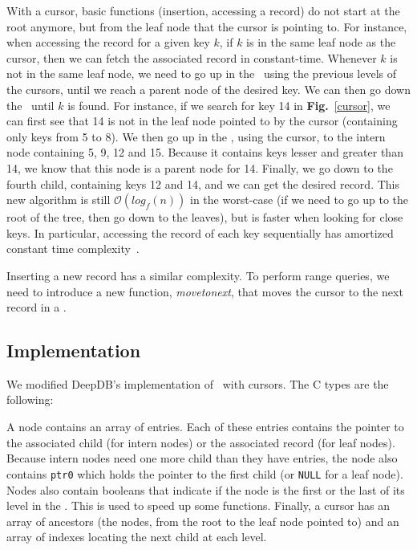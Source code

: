 \cursor

With a cursor, basic functions (insertion, accessing a record) do not start at the root anymore, but from the leaf node that the cursor is pointing to.
For instance, when accessing the record for a given key $k$, if $k$ is in the same leaf node as the cursor, then we can fetch the associated record in constant-time.
Whenever $k$ is not in the same leaf node, we need to go up in the \btree\ using the previous levels of the cursors, until we reach a parent node of the desired key.
We can then go down the \btree\ until $k$ is found.
For instance, if we search for key 14 in \textbf{Fig.}~\ref{cursor}, we can first see that 14 is not in the leaf node pointed to by the cursor (containing only keys from 5 to 8).
We then go up in the \btree, using the cursor, to the intern node containing 5, 9, 12 and 15.
Because it contains keys lesser and greater than 14, we know that this node is a parent node for 14.
Finally, we go down to the fourth child, containing keys 12 and 14, and we can get the desired record.
This new algorithm is still $\mathcal{O}(log_{f}(n))$ in the worst-case (if we need to go up to the root of the tree, then go down to the leaves),
but is faster when looking for close keys.
In particular, accessing the record of each key sequentially has amortized constant time complexity~\cite{tosin}.

Inserting a new record has a similar complexity.
To perform range queries, we need to introduce a new function, \textit{movetonext}, that moves the cursor to the next record in a \btree.

\subsection{Implementation}
We modified DeepDB's implementation of \btrees\ with cursors. The C types are the following:

\begin{multicols}{2}

\end{multicols}

A node contains an array of entries.
Each of these entries contains the pointer to the associated child (for intern nodes) or the associated record (for leaf nodes).
Because intern nodes need one more child than they have entries, the node also contains \texttt{ptr0} which holds the pointer to the first child (or \texttt{NULL} for a leaf node).
Nodes also contain booleans that indicate if the node is the first or the last of its level in the \btree.
This is used to speed up some functions.
Finally, a cursor has an array of ancestors (the nodes, from the root to the leaf node pointed to) and an array of indexes locating the next child at each level.

